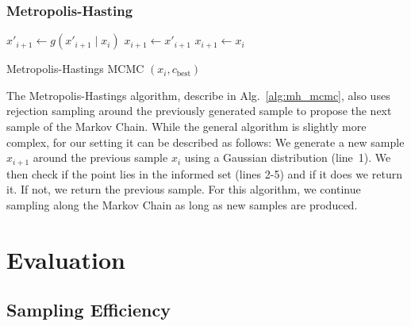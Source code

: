 \documentclass[letterpaper, 10 pt, conference]{ieeeconf}  %
\begin{document}
\subsubsection{Metropolis-Hasting}

\begin{algorithm}[t]
	\begin{algorithmic}[1]
		\STATE $ x'_{i+1} \leftarrow g( x'_{i+1} \mid x_{i} ) $
		  \RETURN $ x_{i+1} \leftarrow x'_{i+1} $ 
		\ELSE
		  \RETURN $ x_{i+1} \leftarrow x_{i} $
		\ENDIF 
	\end{algorithmic}
	\caption{Metropolis-Hastings MCMC $(x_{i}, c_{\text{best}})$}
	\label{alg:mh_mcmc}	
\end{algorithm}

The Metropolis-Hastings algorithm, describe in Alg.~\ref{alg:mh_mcmc}, also uses rejection sampling around the previously generated sample to propose the next sample of the Markov Chain.
While the general algorithm is slightly more complex, for our setting it can be described as follows:
We generate a new sample $ x_{i+1}$ around the previous sample $ x_{i}$ using a Gaussian distribution (line~1).
We then check if the point lies in the informed set (lines 2-5) and if it does we return it.
If not, we return the previous sample.
%
For this algorithm, we continue sampling along the Markov Chain as long as new samples are produced.


\section{Evaluation}

\label{sec:eval}


\subsection{Sampling Efficiency}
\end{document}
